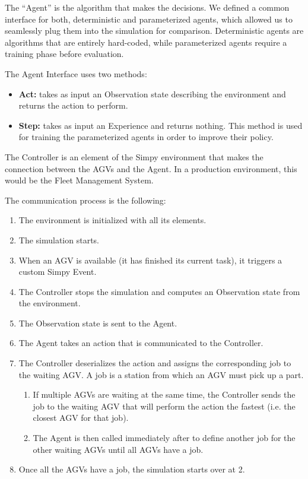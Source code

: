 \documentclass[sn-mathphys]{sn-jnl}
\begin{document}
The “Agent” is the algorithm that makes the decisions. We defined a common interface for both, deterministic and parameterized agents, which allowed us to seamlessly plug them into the simulation for comparison. Deterministic agents are algorithms that are entirely hard-coded, while parameterized agents require a training phase before evaluation.

The Agent Interface uses two methods:
\begin{itemize}
    \item \textbf{Act:} takes as input an Observation state describing the environment and returns the action to perform.
    \item \textbf{Step:} takes as input an Experience and returns nothing. This method is used for training the parameterized agents in order to improve their policy.
\end{itemize}

The Controller is an element of the Simpy environment that makes the connection between the AGVs and the Agent. In a production environment, this would be the Fleet Management System.

The communication process is the following:

\begin{enumerate}
    \item The environment is initialized with all its elements.
    \item The simulation starts.
    \item When an AGV is available (it has finished its current task), it triggers a custom Simpy Event. 
    \item The Controller stops the simulation and computes an Observation state from the environment.
    \item The Observation state is sent to the Agent.
    \item The Agent takes an action that is communicated to the Controller.
    \item The Controller deserializes the action and assigns the corresponding job to the waiting AGV. A job is a station from which an AGV must pick up a part.
    \begin{enumerate}
        \item If multiple AGVs are waiting at the same time, the Controller sends the job to the waiting AGV that will perform the action the fastest (i.e. the closest AGV for that job).
        \item The Agent is then called immediately after to define another job for the other waiting AGVs until all AGVs have a job.
    \end{enumerate}
    \item Once all the AGVs have a job, the simulation starts over at 2.
\end{enumerate}
\end{document}
